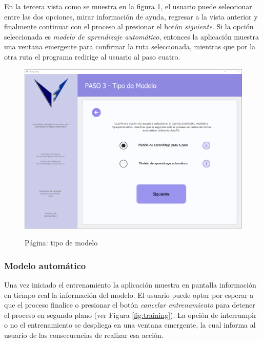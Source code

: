 En la tercera vista como se muestra en la figura \ref{fig:modeltype}, el usuario puede seleccionar entre las dos opciones, mirar información de ayuda, regresar a la vista anterior y finalmente continuar con el proceso al presionar el botón \textit{siguiente}. Si la opción seleccionada es \textit{modelo de aprendizaje automático}, entonces la aplicación muestra una ventana emergente para confirmar la ruta seleccionada, mientras que por la otra ruta el programa redirige al usuario al paso cuatro.

\begin{figure}[H]
    \centering
    \caption{Página: tipo de modelo}
    \includegraphics[width=\textwidth]{views/model.png}
    \label{fig:modeltype}
\end{figure}

\subsubsection{Modelo automático}

Una vez iniciado el entrenamiento la aplicación muestra en pantalla información en tiempo real la información del modelo. El usuario puede optar por esperar a que el proceso finalice o presionar el botón \textit{cancelar entrenamiento} para detener el proceso en segundo plano (ver Figura \ref{fig:training}). La opción de interrumpir o no el entrenamiento se despliega en una ventana emergente, la cual informa al usuario de las consecuencias de realizar esa acción.

